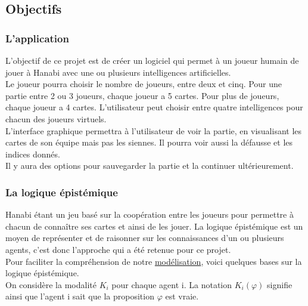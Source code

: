 \documentclass[11pt, letterpaper]{article}
\begin{document}
\subsection{Objectifs}

\subsubsection{L'application}

\noindent
L'objectif de ce projet est de créer un logiciel qui permet à un joueur humain de jouer à Hanabi avec une ou plusieurs intelligences artificielles. \\

\noindent Le joueur pourra choisir le nombre de joueurs, entre deux et cinq. Pour une partie entre 2 ou 3 joueurs, chaque joueur a 5 cartes. Pour plus de joueurs, chaque joueur a 4 cartes. L'utilisateur peut choisir entre quatre intelligences pour chacun des joueurs virtuels.\\

\noindent L'interface graphique permettra à l'utilisateur de voir la partie, en visualisant les cartes de son équipe mais pas les siennes. Il pourra voir aussi la défausse et les indices donnés.\\

\noindent Il y aura des options pour sauvegarder la partie et la continuer ultérieurement. \\

\subsubsection{La logique épistémique}

\noindent Hanabi étant un jeu basé sur la coopération entre les joueurs pour permettre à chacun de connaître ses cartes et ainsi de les jouer. La logique épistémique est un moyen de représenter et de raisonner sur les connaissances d'un ou plusieurs agents, c'est donc l'approche qui a été retenue pour ce projet.\\

\noindent Pour faciliter la compréhension de notre  \hyperref[modelisation]{modélisation}, voici quelques bases sur la logique épistémique.\\

\noindent On considère la modalité $K_i$ pour chaque agent i. La notation $K_i(\varphi)$ signifie ainsi que l'agent i sait que la proposition $\varphi$ est vraie.\\
\end{document}

